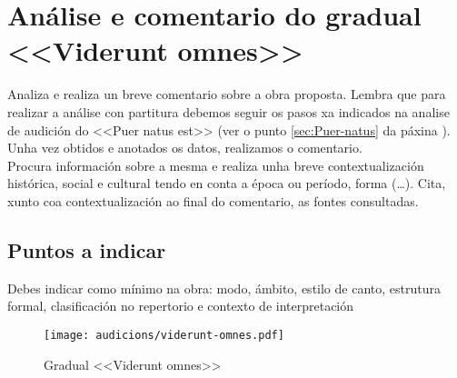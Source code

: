 %
%
\section{Análise e comentario do gradual <<Viderunt omnes>>} \label{subsec:Viderunt-omnes}
%
\noindent
Analiza e realiza un breve comentario sobre a obra proposta. Lembra que para realizar a análise con partitura debemos seguir os pasos xa indicados na analise de audición do <<Puer natus est>> (ver o punto \ref{sec:Puer-natus} da páxina \pageref{sec:Puer-natus}). Unha vez obtidos e anotados os datos, realizamos o comentario. \\
Procura información sobre a mesma e realiza unha breve contextualización histórica, social e cultural tendo en conta a época ou período, forma (\ldots). Cita, xunto coa contextualización ao final do comentario, as fontes consultadas.\par
\subsection*{Puntos a indicar}
Debes indicar como mínimo na obra: modo, ámbito, estilo de canto, estrutura formal, clasificación no repertorio e contexto de interpretación


\vspace*{0.15cm}
%
%
\begin{figure}[h]
    \centering
    \texttt{[image: audicions/viderunt-omnes.pdf]}
    \caption{Gradual <<Viderunt omnes>>}
    \label{fig:Viderunt-omnes}
\end{figure}

%
\vspace*{0.5cm}
\begin{ejercicio}

%

        \vspace*{20.78cm}
\end{ejercicio}

